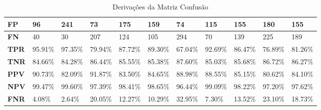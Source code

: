 \documentclass[a4paper]{article}
\begin{document}
\begin{table}[H]
\begin{tabular}{|l|l|l|l|l|l|l|l|l|l|l|}
        \multicolumn{1}{|l|}{\textbf{FP}}  & 96                              & 241                             & 73                              & 175                             & 159                             & 74                              & 115                             & 155                             & 180                             & 155                             \\ \hline
        \multicolumn{1}{|l|}{\textbf{FN}}  & 40                              & 30                              & 207                             & 124                             & 105                             & 294                             & 70                              & 139                             & 225                             & 189                             \\ \hline
        \multicolumn{1}{|l|}{\textbf{TPR}} & \cellcolor[HTML]{9AFF99}95.91\% & \cellcolor[HTML]{9AFF99}97.35\% & \cellcolor[HTML]{FFFFC7}79.94\% & \cellcolor[HTML]{9AFF99}87.72\% & \cellcolor[HTML]{9AFF99}89.30\% & \cellcolor[HTML]{FFCCC9}67.04\% & \cellcolor[HTML]{9AFF99}92.69\% & \cellcolor[HTML]{9AFF99}86.47\% & \cellcolor[HTML]{FFFFC7}76.89\% & \cellcolor[HTML]{FFFFC7}81.26\% \\ \hline
        \multicolumn{1}{|l|}{\textbf{TNR}} & \cellcolor[HTML]{FFFFC7}84.66\% & \cellcolor[HTML]{FFFFC7}84.28\% & \cellcolor[HTML]{9AFF99}86.44\% & \cellcolor[HTML]{9AFF99}85.55\% & \cellcolor[HTML]{9AFF99}85.38\% & \cellcolor[HTML]{9AFF99}87.60\% & \cellcolor[HTML]{9AFF99}85.03\% & \cellcolor[HTML]{9AFF99}85.68\% & \cellcolor[HTML]{9AFF99}86.72\% & \cellcolor[HTML]{9AFF99}86.27\% \\ \hline
        \multicolumn{1}{|l|}{\textbf{PPV}} & 90.73\%                         & 82.09\%                         & 91.87\%                         & 83.50\%                         & 84.65\%                         & 88.98\%                         & 88.55\%                         & 85.15\%                         & 80.62\%                         & 84.10\%                         \\ \hline
        \multicolumn{1}{|l|}{\textbf{NPV}} & 99.47\%                         & 99.60\%                         & 97.39\%                         & 98.41\%                         & 98.65\%                         & 96.44\%                         & 99.09\%                         & 98.22\%                         & 97.20\%                         & 97.62\%                         \\ \hline
        \multicolumn{1}{|l|}{\textbf{FNR}} & \cellcolor[HTML]{9AFF99}4.08\%  & \cellcolor[HTML]{9AFF99}2.64\%  & \cellcolor[HTML]{FFFFC7}20.05\% & \cellcolor[HTML]{9AFF99}12.27\% & \cellcolor[HTML]{9AFF99}10.29\% & \cellcolor[HTML]{FFCCC9}32.95\% & \cellcolor[HTML]{9AFF99}7.30\%  & \cellcolor[HTML]{9AFF99}13.52\% & \cellcolor[HTML]{FFFFC7}23.10\% & \cellcolor[HTML]{FFFFC7}18.73\% \\ \hline
    \end{tabular}
    \caption{Derivações da Matriz Confusão}
    \label{table2}
\end{table}
\end{document}
